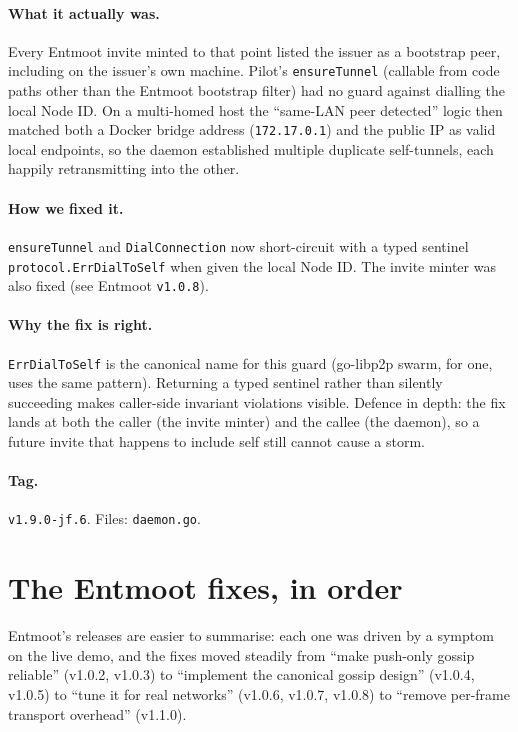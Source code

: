 \documentclass[11pt,a4paper]{article}
\begin{document}
\paragraph{What it actually was.} Every Entmoot invite minted to
that point listed the issuer as a bootstrap peer, including on
the issuer's own machine. Pilot's \texttt{ensureTunnel} (callable
from code paths other than the Entmoot bootstrap filter) had no
guard against dialling the local Node ID. On a multi-homed host
the ``same-LAN peer detected'' logic then matched both a Docker
bridge address (\texttt{172.17.0.1}) and the public IP as valid
local endpoints, so the daemon established multiple duplicate
self-tunnels, each happily retransmitting into the other.

\paragraph{How we fixed it.} \texttt{ensureTunnel} and
\texttt{DialConnection} now short-circuit with a typed sentinel
\texttt{protocol.ErrDialToSelf} when given the local Node ID.
The invite minter was also fixed (see Entmoot \texttt{v1.0.8}).

\paragraph{Why the fix is right.} \texttt{ErrDialToSelf} is the
canonical name for this guard (go-libp2p swarm, for one, uses
the same pattern). Returning a typed sentinel rather than
silently succeeding makes caller-side invariant violations
visible. Defence in depth: the fix lands at both the caller (the
invite minter) and the callee (the daemon), so a future invite
that happens to include self still cannot cause a storm.

\paragraph*{Tag.} \texttt{v1.9.0-jf.6}. Files: \texttt{daemon.go}.

\section{The Entmoot fixes, in order}
\label{sec:entmoot}

Entmoot's releases are easier to summarise: each one was driven
by a symptom on the live demo, and the fixes moved steadily from
``make push-only gossip reliable'' (v1.0.2, v1.0.3) to
``implement the canonical gossip design'' (v1.0.4, v1.0.5) to
``tune it for real networks'' (v1.0.6, v1.0.7, v1.0.8) to
``remove per-frame transport overhead'' (v1.1.0).
\end{document}
